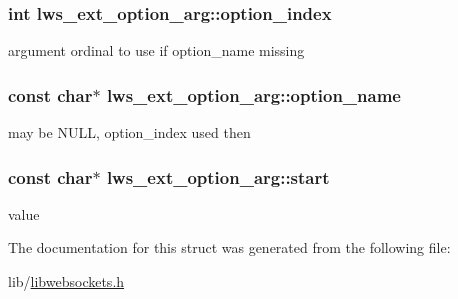 \subsubsection[{\texorpdfstring{option\+\_\+index}{option\_index}}]{\setlength{\rightskip}{0pt plus 5cm}int lws\+\_\+ext\+\_\+option\+\_\+arg\+::option\+\_\+index}\hypertarget{structlws__ext__option__arg_af57fffcfa253dfa8d98681ac1fb1785f}{}\label{structlws__ext__option__arg_af57fffcfa253dfa8d98681ac1fb1785f}
argument ordinal to use if option\+\_\+name missing 
\subsubsection[{\texorpdfstring{option\+\_\+name}{option\_name}}]{\setlength{\rightskip}{0pt plus 5cm}const char$\ast$ lws\+\_\+ext\+\_\+option\+\_\+arg\+::option\+\_\+name}\hypertarget{structlws__ext__option__arg_a0a320c56b79271b8f059eeaad9423ac9}{}\label{structlws__ext__option__arg_a0a320c56b79271b8f059eeaad9423ac9}
may be N\+U\+LL, option\+\_\+index used then 
\subsubsection[{\texorpdfstring{start}{start}}]{\setlength{\rightskip}{0pt plus 5cm}const char$\ast$ lws\+\_\+ext\+\_\+option\+\_\+arg\+::start}\hypertarget{structlws__ext__option__arg_a0b1f7b30c3ceaf5f1bf9d105c24568d1}{}\label{structlws__ext__option__arg_a0b1f7b30c3ceaf5f1bf9d105c24568d1}
value 

The documentation for this struct was generated from the following file\+:\begin{DoxyCompactItemize}
\item 
lib/\hyperlink{libwebsockets_8h}{libwebsockets.\+h}\end{DoxyCompactItemize}
